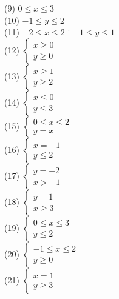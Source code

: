 \documentclass[10pt]{article}
\begin{document}
\begin{enumerate}
(9) \(0 \leqslant x \leqslant 3\)\\
(10) \(-1 \leqslant y \leqslant 2\)\\
(11) \(-2 \leqslant x \leqslant 2\) i \(-1 \leqslant y \leqslant 1\)\\
(12) \(\left\{\begin{array}{l}x \geqslant 0 \\ y \geqslant 0\end{array}\right.\)\\
(13) \(\left\{\begin{array}{l}x \geqslant 1 \\ y \geqslant 2\end{array}\right.\)\\
(14) \(\left\{\begin{array}{l}x \leqslant 0 \\ y \leqslant 3\end{array}\right.\)\\
(15) \(\left\{\begin{array}{l}0 \leqslant x \leqslant 2 \\ y=x\end{array}\right.\)\\
(16) \(\left\{\begin{array}{l}x=-1 \\ y \leqslant 2\end{array}\right.\)\\
(17) \(\left\{\begin{array}{l}y=-2 \\ x>-1\end{array}\right.\)\\
(18) \(\left\{\begin{array}{l}y=1 \\ x \geqslant 3\end{array}\right.\)\\
(19) \(\left\{\begin{array}{l}0 \leqslant x \leqslant 3 \\ y \leqslant 2\end{array}\right.\)\\
(20) \(\left\{\begin{array}{l}-1 \leqslant x \leqslant 2 \\ y \geqslant 0\end{array}\right.\)\\
(21) \(\left\{\begin{array}{l}x=1 \\ y \geqslant 3\end{array}\right.\)\\

\end{enumerate}
\end{document}
